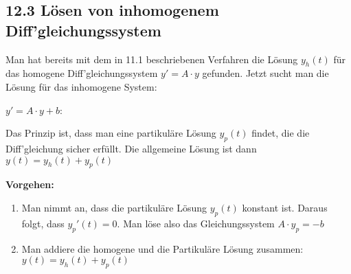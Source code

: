 \subsection{12.3 Lösen von inhomogenem Diff'gleichungssystem}{
\vskip1pt

Man hat bereits mit dem in 11.1 beschriebenen Verfahren die Lösung $y_h(t)$ für das homogene Diff'gleichungssystem $y' = A\cdot y$ gefunden. Jetzt sucht man die Lösung für das inhomogene System: \vskip5pt
\begin{center}
$y' = A\cdot y + b$: \vskip5pt
\end{center}
\vskip5pt
Das Prinzip ist, dass man eine partikuläre Lösung $y_p(t)$ findet, die die Diff'gleichung sicher erfüllt. Die allgemeine Lösung ist dann $y(t) = y_h(t) + y_p(t)$ \par
\vskip6pt

\textbf{Vorgehen:} \vskip1pt

\begin{enumerate}[label=\protect\circled{\arabic*}]
\item Man nimmt an, dass die partikuläre Lösung $y_p(t)$ konstant ist. Daraus folgt, dass $y_p'(t) = 0$. Man löse also das Gleichungssystem $A \cdot y_p = -b$

\item Man addiere die homogene und die Partikuläre Lösung zusammen: $y(t) = y_h(t) + y_p(t)$

\end{enumerate}

}
\WhiteSpace